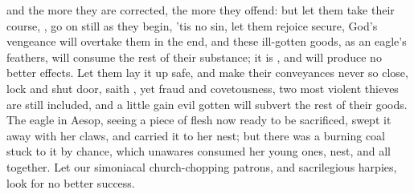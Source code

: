 {and the more they are corrected, the more they offend: but let them
take their course, , go on still as they begin,
'tis no sin, let them rejoice secure, God's vengeance will overtake
them in the end, and these ill-gotten goods, as an eagle's feathers,
 will consume the rest of their substance; it is , and will produce no better effects. Let them lay it
up safe, and make their conveyances never so close, lock and shut door,
saith \Chrysostom{}, yet fraud and covetousness, two most violent thieves
are still included, and a little gain evil gotten will subvert the rest
of their goods. The eagle in Aesop, seeing a piece of flesh now ready
to be sacrificed, swept it away with her claws, and carried it to her
nest; but there was a burning coal stuck to it by chance, which
unawares consumed her young ones, nest, and all together. Let our
simoniacal church-chopping patrons, and sacrilegious harpies, look for
no better success.

}
